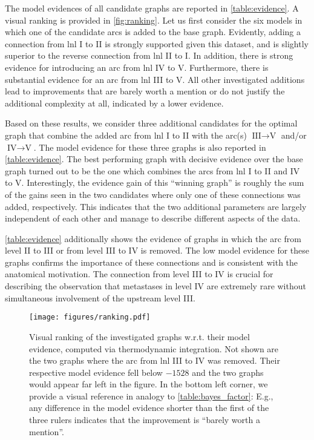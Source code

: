 \documentclass[twocolumn]{aastex631}
\begin{document}
The model evidences of all candidate graphs are reported in \autoref{table:evidence}. A visual ranking is provided in \autoref{fig:ranking}. Let us first consider the six models in which one of the candidate arcs is added to the base graph. Evidently, adding a connection from \gls{lnl} I to II is strongly supported given this dataset, and is slightly superior to the reverse connection from \gls{lnl} II to I. In addition, there is strong evidence for introducing an arc from \gls{lnl} IV to V. Furthermore, there is substantial evidence for an arc from \gls{lnl} III to V. All other investigated additions lead to improvements that are barely worth a mention or do not justify the additional complexity at all, indicated by a lower evidence. 

Based on these results, we consider three additional candidates for the optimal graph that combine the added arc from \gls{lnl} I to II with the arc(s) $\text{III} \rightarrow \text{V}$ and/or $\text{IV} \rightarrow \text{V}$. The model evidence for these three graphs is also reported in \autoref{table:evidence}. The best performing graph with decisive evidence over the base graph turned out to be the one which combines the arcs from \gls{lnl} I to II and IV to V. Interestingly, the evidence gain of this ``winning graph'' is roughly the sum of the gains seen in the two candidates where only one of these connections was added, respectively. This indicates that the two additional parameters are largely independent of each other and manage to describe different aspects of the data.

\autoref{table:evidence} additionally shows the evidence of graphs in which the arc from level II to III or from level III to IV is removed. The low model evidence for these graphs confirms the importance of these connections and is consistent with the anatomical motivation. The connection from level III to IV is crucial for describing the observation that metastases in level IV are extremely rare without simultaneous involvement of the upstream level III. 

\begin{figure*}
    \centering
    \texttt{[image: figures/ranking.pdf]}
    \caption{Visual ranking of the investigated graphs w.r.t. their model evidence, computed via thermodynamic integration. Not shown are the two graphs where the arc from \gls{lnl} III to IV was removed. Their respective model evidence fell below $-1528$ and the two graphs would appear far left in the figure. In the bottom left corner, we provide a visual reference in analogy to \autoref{table:bayes_factor}: E.g., any difference in the model evidence shorter than the first of the three rulers indicates that the improvement is ``barely worth a mention''. \label{fig:ranking}}
\end{figure*}
\end{document}
